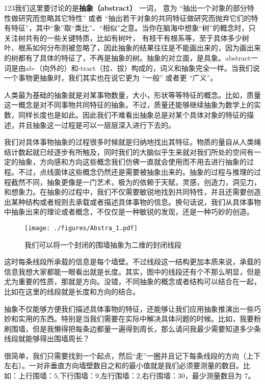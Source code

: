 
123我们这里要讨论的是\textbf{抽象（abstract）} 一词， 意为 “抽出一个对象的部分特性做研究而忽略其它特性” 或者 “抽出若干对象的共同特征做研究而抛弃它们的特有特征”，其中“象”取“类比”、“相似”之意。当你在脑海中想象“树”的概念时，只关注树共有的一些关键特质，比如有树叶， 有枝干有根系等，至于具体多少树叶、根系如何分布则被忽略了，因此抽象的结果往往是不能画出来的，因为画出来的树都有了具体的特征了，不再是抽象的树。抽象的对立面，是具象。abstract一词是由ab-（向外的）和-tract（拉、拔）构成的，词义和抽象完全一样。当我们说一个事物更抽象时，我们其实也在说它更为 “一般” 或者更 “广义”。


人类最为基础的抽象就是对某事物数量，大小，形状等等特征的概念。比如，质量这一概念是对不同事物共同特征的抽象。不过，质量还能够继续抽象为数学上的实数，同样长度也是如此。因此我们不难看出抽象总是对某个具体对象的特征的描述，并且抽象这一过程是可以一层层深入进行下去的。

我们对具体事物抽象的过程很多时候就是归纳地找出其特征。物质的量自从人类绳结计数起就已经逐步有所触及，同时我们的大脑似乎生来就对我们所处的空间有一定的抽象，方向感和方向这些概念我们仿佛一直就会使用而不用去进行抽象的过程。不过，点线面体这些概念仍然还是需要被抽象出来的。抽象的过程与推理的过程截然不同，抽象更像是一门艺术，极为的依赖于天赋，灵感，创造力，洞见力，和想象力。在抽象的过程中，我们不仅需要敏锐地找到共同特性，并且还需要创造出某种结构或者规则去承载或者描述具体事物的信息。换句话说，我们从具体事物中抽象出来的理论或者概念，不仅仅是一种敏锐的发现，还是一种巧妙的创造。

\begin{figure}[ht]
\centering
\texttt{[image: ./figures/Abstra\_1.pdf]}
\caption{我们可以将一个封闭的围墙抽象为二维的封闭线段} \label{Abstra_fig1}
\end{figure}

这时每条线段所承载的信息是每个墙壁。不过线段这一结构更加本质来说，承载的信息我想大家都能一眼看出就是长度。其实，图中的线段还有个不那么明显，但是尤为重要的性质，那就是方向。没错，不同抽象的概念或者结构可以结合在一起，比如在这里的线段就是长度和方向的结合。

抽象不仅能够方便我们描述具体事物的特征，还能够让我们应用抽象推演出一些巧妙和实用的东西。特别是当我们需要在实际中解决具体问题的时候。比如，我要粉刷围墙，但是我懒得把每条边都量一遍得到周长，那么请问我最少需要知道多少条线段就能够得出围墙周长？

很简单，我们只需要找到一个起点，然后“走”一圈并且记下每条线段的方向（上下左右）。一对非垂直方向墙壁数目之和的最小值就是我们必须要测量的数目。比如：上行围墙：$5$,下行围墙：$9$,左行围墙：$2$,右行围墙：$30$，最少测量数目为 $7$。

